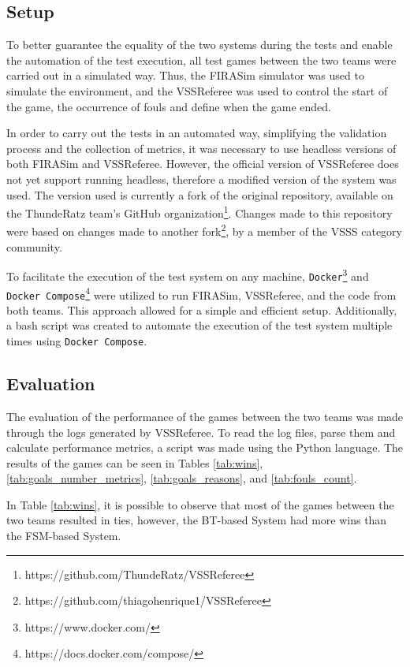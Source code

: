 \subsection{Setup}

To better guarantee the equality of the two systems during the tests and enable the automation of the test execution, all test games between the two teams were carried out in a simulated way. Thus, the FIRASim simulator \cite{FIRASim} was used to simulate the environment, and the VSSReferee \cite{VSSReferee} was used to control the start of the game, the occurrence of fouls and define when the game ended.

In order to carry out the tests in an automated way, simplifying the validation process and the collection of metrics, it was necessary to use headless versions of both FIRASim and VSSReferee. However, the official version of VSSReferee does not yet support running headless, therefore a modified version of the system was used. The version used is currently a fork of the original repository, available on the ThundeRatz team's GitHub organization\footnote{https://github.com/ThundeRatz/VSSReferee}. Changes made to this repository were based on changes made to another fork\footnote{https://github.com/thiagohenrique1/VSSReferee}, by a member of the VSSS category community.

To facilitate the execution of the test system on any machine, \texttt{Docker}\footnote{https://www.docker.com/} and \texttt{Docker Compose}\footnote{https://docs.docker.com/compose/} were utilized to run FIRASim, VSSReferee, and the code from both teams. This approach allowed for a simple and efficient setup. Additionally, a bash script was created to automate the execution of the test system multiple times using \texttt{Docker Compose}.

\subsection{Evaluation}

The evaluation of the performance of the games between the two teams was made through the logs generated by VSSReferee. To read the log files, parse them and calculate performance metrics, a script was made using the Python language. The results of the games can be seen in Tables \ref{tab:wins}, \ref{tab:goals_number_metrics}, \ref{tab:goals_reasons}, and \ref{tab:fouls_count}.

In Table \ref{tab:wins}, it is possible to observe that most of the games between the two teams resulted in ties, however, the BT-based System had more wins than the FSM-based System.

